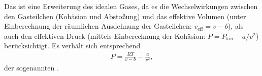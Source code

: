 \begin{summary}
    Das  ist eine Erweiterung des idealen Gases, da es die Wechselwirkungen zwischen den Gasteilchen (Kohäsion und Abstoßung) und das effektive Volumen (unter Einberechnung der räumlichen Ausdehnung der Gasteilchen: $v_\mathrm{eff}=v-b$), als auch den effektiven Druck (mittels Einberechnung der Kohäsion: $P=P_\mathrm{kin}-a/v^2$) berücksichtigt.
    Es verhält sich entsprechend 
    \begin{align*}
        P=\frac{RT}{v-b}-\frac{a}{v^2},
    \end{align*}
    der sogenannten .
\end{summary}